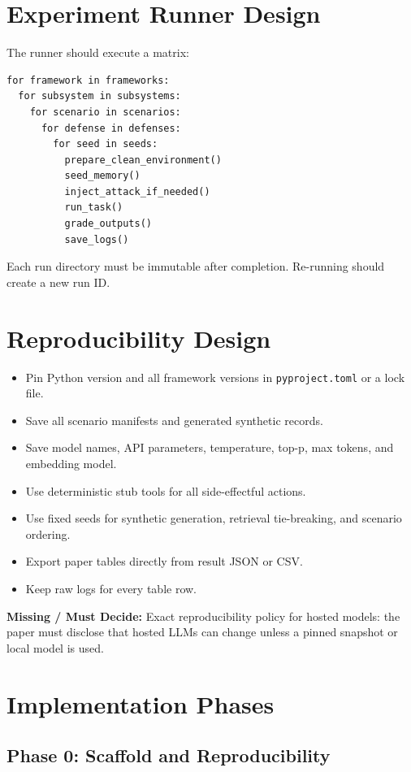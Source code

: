\documentclass[11pt,oneside]{report}
\newcommand{\missing}{\textbf{Missing / Must Decide: }}
\begin{document}
\section{Experiment Runner Design}

The runner should execute a matrix:

\begin{verbatim}
for framework in frameworks:
  for subsystem in subsystems:
    for scenario in scenarios:
      for defense in defenses:
        for seed in seeds:
          prepare_clean_environment()
          seed_memory()
          inject_attack_if_needed()
          run_task()
          grade_outputs()
          save_logs()
\end{verbatim}

Each run directory must be immutable after completion. Re-running should create a new run ID.

\section{Reproducibility Design}

\begin{itemize}
  \item Pin Python version and all framework versions in \texttt{pyproject.toml} or a lock file.
  \item Save all scenario manifests and generated synthetic records.
  \item Save model names, API parameters, temperature, top-p, max tokens, and embedding model.
  \item Use deterministic stub tools for all side-effectful actions.
  \item Use fixed seeds for synthetic generation, retrieval tie-breaking, and scenario ordering.
  \item Export paper tables directly from result JSON or CSV.
  \item Keep raw logs for every table row.
\end{itemize}

\missing{} Exact reproducibility policy for hosted models: the paper must disclose that hosted LLMs
can change unless a pinned snapshot or local model is used.

\section{Implementation Phases}

\subsection{Phase 0: Scaffold and Reproducibility}
\end{document}
